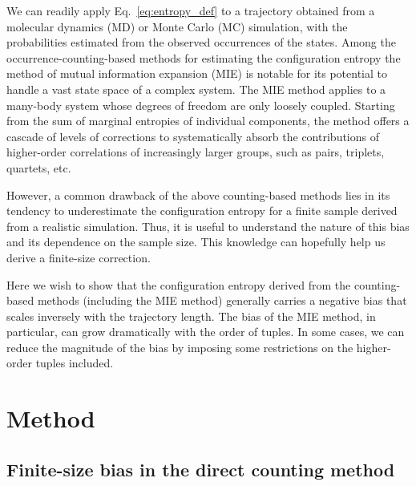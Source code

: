 \documentclass[preprint, superscriptaddress]{revtex4-1}
\begin{document}
We can readily apply Eq.~\eqref{eq:entropy_def} to a trajectory
obtained from a molecular dynamics (MD) or Monte Carlo (MC) simulation,
with the probabilities estimated from the observed occurrences of the states.
%
Among the occurrence-counting-based methods for estimating the configuration entropy
the method of mutual information expansion (MIE) is notable
for its potential to handle a vast state space of a complex system.
%
The MIE method applies to a many-body system
whose degrees of freedom are only loosely coupled.
%
Starting from the sum of marginal entropies of individual components,
the method offers a cascade of levels of corrections
to systematically absorb the contributions of higher-order correlations
of increasingly larger groups, such as pairs, triplets, quartets, etc.

However, a common drawback of the above counting-based methods
lies in its tendency to underestimate the configuration entropy for a finite sample
derived from a realistic simulation.
%
Thus, it is useful to understand the nature of this bias
and its dependence on the sample size.
%
This knowledge can hopefully help us derive a finite-size correction.

Here we wish to show that the configuration entropy derived
from the counting-based methods (including the MIE method)
generally carries a negative bias that scales inversely with the trajectory length.
%
The bias of the MIE method, in particular,
can grow dramatically with the order of tuples.
%
In some cases, we can reduce the magnitude of the bias
by imposing some restrictions on the higher-order tuples included.

\section{Method}

\subsection{\label{sec:fsbias}
Finite-size bias in the direct counting method}
\end{document}
